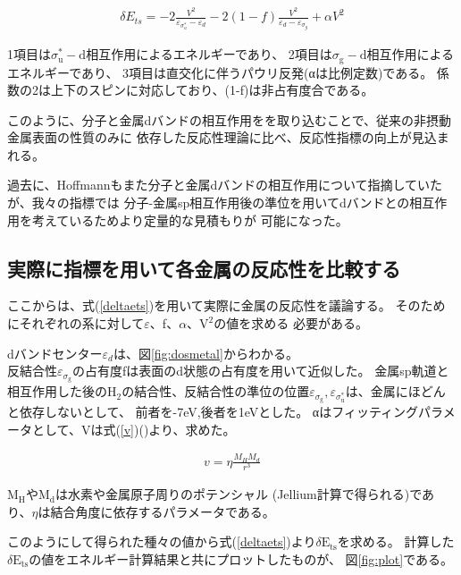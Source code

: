 \documentclass[12pt]{ltjsarticle}
\begin{document}
\begin{eqnarray}
    \label{deltaets}
    \delta E_{ts} = -2 \frac{ V^2 }{\varepsilon _{\sigma_u^*} - \varepsilon _d}
                    -2(1-f)\frac{V^2}{\varepsilon _d - \varepsilon _{\sigma_g}}
                    + \alpha V^2
\end{eqnarray}

1項目は$\sigma _\text{u}^* -\text{d}$相互作用によるエネルギーであり、
2項目は$\sigma _\text{g}-\text{d}$相互作用によるエネルギーであり、
3項目は直交化に伴うパウリ反発(αは比例定数)である。
係数の2は上下のスピンに対応しており、(1-f)は非占有度合である。

このように、分子と金属dバンドの相互作用をを取り込むことで、従来の非摂動金属表面の性質のみに
依存した反応性理論に比べ、反応性指標の向上が見込まれる。

過去に、Hoffmannもまた分子と金属dバンドの相互作用について指摘していたが、我々の指標では
分子-金属sp相互作用後の準位を用いてdバンドとの相互作用を考えているためより定量的な見積もりが
可能になった。

\subsection{実際に指標を用いて各金属の反応性を比較する}
ここからは、式(\ref{deltaets})を用いて実際に金属の反応性を議論する。
そのためにそれぞれの系に対して$\varepsilon$、f、$\alpha$、$\text{V}^\text{2}$の値を求める
必要がある。

dバンドセンター$\varepsilon_d$は、図\ref{fig:dosmetal}からわかる。\\
反結合性$\varepsilon _{\sigma_\text{g}}$の占有度fは表面のd状態の占有度を用いて近似した。
金属sp軌道と相互作用した後の$\text{H}_\text{2}$の結合性、反結合性の準位の位置$\varepsilon _
{\sigma_\text{g}},\varepsilon _{\sigma_\text{u}^*}$は、金属にほどんと依存しないとして、
前者を-7eV,後者を1eVとした。
αはフィッティングパラメータとして、Vは式(\ref{v})(\cite{Norskov1989})より、求めた。

\begin{eqnarray}
    \label{v}
    v = \eta \frac{ M_H M_d }{r^3}
\end{eqnarray}

$\text{M}_\text{H}$や$\text{M}_\text{d}$は水素や金属原子周りのポテンシャル
(Jellium計算で得られる)であり、$\eta$は結合角度に依存するパラメータである。

このようにして得られた種々の値から式(\ref{deltaets})より$\delta \text{E}_\text{ts}$を求める。
計算した$\delta \text{E}_\text{ts}$の値をエネルギー計算結果と共にプロットしたものが、
図\ref{fig:plot}である。
\end{document}
